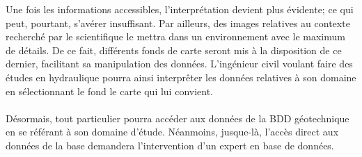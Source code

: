 \par
Une fois les informations accessibles, l'interprétation devient 
plus évidente; ce qui peut, pourtant, s'avérer insuffisant. Par 
ailleurs, des images relatives au contexte recherché par le scientifique 
le mettra dans un environnement avec le maximum de détails. De ce fait, 
différents fonds de carte seront mis 
à la disposition de ce dernier, facilitant sa manipulation des données. 
L'ingénieur civil voulant faire des études en hydraulique pourra ainsi 
interprêter les données relatives à son domaine en sélectionnant 
le fond le carte qui lui convient.
\paragraph{}
Désormais, tout particulier pourra accéder aux données de la BDD 
géotechnique en se référant à son domaine d'étude. Néanmoins, jusque-là,
l'accès direct aux données de la base demandera l'intervention d'un 
expert en base de données.